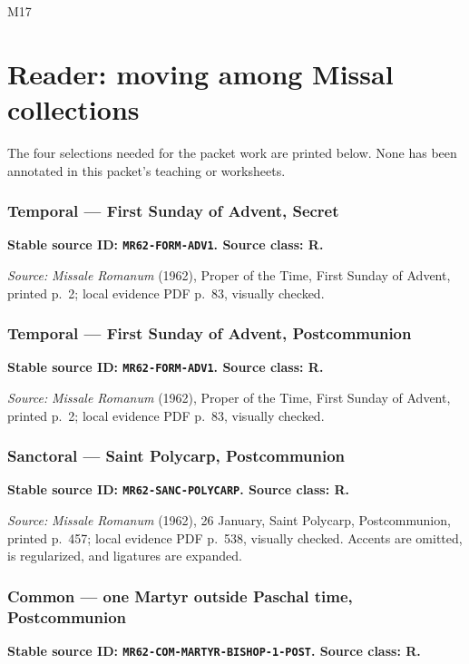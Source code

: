 \begin{courseunit}{M17}
\chapter{Reader: moving among Missal collections}

The four selections needed for the packet work are printed below.  None has
been annotated in this packet's teaching or worksheets.

\subsection*{Temporal --- First Sunday of Advent, Secret}
\textbf{Stable source ID: \texttt{MR62-FORM-ADV1}. Source class: R.}

\ReaderAdventSecret

\emph{Source:} \textit{Missale Romanum} (1962), Proper of the Time, First
Sunday of Advent, printed p.~2; local evidence PDF p.~83, visually checked.

\subsection*{Temporal --- First Sunday of Advent, Postcommunion}
\textbf{Stable source ID: \texttt{MR62-FORM-ADV1}. Source class: R.}

\ReaderAdventPostcommunion

\emph{Source:} \textit{Missale Romanum} (1962), Proper of the Time, First
Sunday of Advent, printed p.~2; local evidence PDF p.~83, visually checked.

\subsection*{Sanctoral --- Saint Polycarp, Postcommunion}
\textbf{Stable source ID: \texttt{MR62-SANC-POLYCARP}. Source class: R.}


\emph{Source:} \textit{Missale Romanum} (1962), 26 January, Saint Polycarp,
Postcommunion, printed p.~457; local evidence PDF p.~538, visually checked.
Accents are omitted,  is regularized, and ligatures are expanded.

\subsection*{Common --- one Martyr outside Paschal time, Postcommunion}
\textbf{Stable source ID: \texttt{MR62-COM-MARTYR-BISHOP-1-POST}. Source
class: R.}


\end{courseunit}
